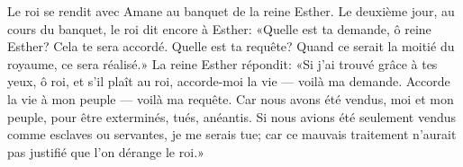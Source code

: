 Le roi se rendit avec Amane au banquet de la reine Esther.
Le deuxième jour, au cours du banquet, le roi dit encore à Esther:
	«Quelle est ta demande, ô reine Esther?
	Cela te sera accordé.
Quelle est ta requête?
	Quand ce serait la moitié du royaume, ce sera réalisé.»
La reine Esther répondit:
	«Si j’ai trouvé grâce à tes yeux, ô roi, et s’il plaît au roi,
	accorde-moi la vie --- voilà ma demande.
	Accorde la vie à mon peuple --- voilà ma requête.
Car nous avons été vendus, moi et mon peuple, pour être exterminés, tués, anéantis.
Si nous avions été seulement vendus comme esclaves ou servantes, je me serais tue;
	car ce mauvais traitement n’aurait pas justifié que l’on dérange le roi.»
